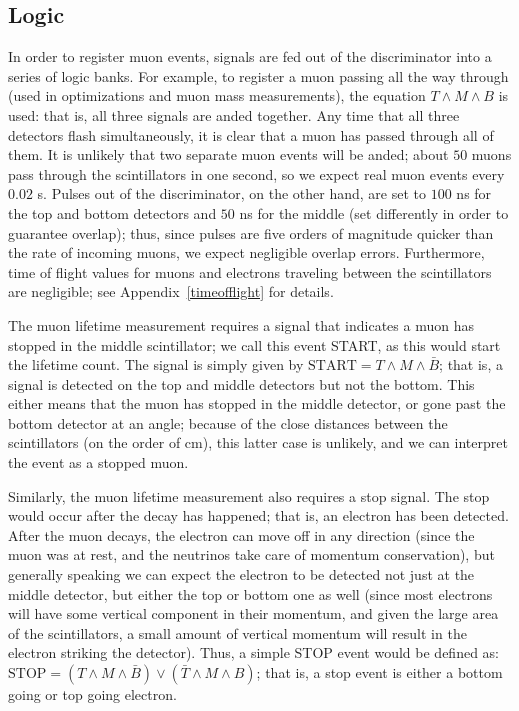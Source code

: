 \subsection{Logic}
\label{logic}

In order to register muon events, signals are fed out of the discriminator into a series of logic banks. For example, to register a muon passing all the way through (used in optimizations and muon mass measurements), the equation $T \wedge M \wedge B$ is used: that is, all three signals are anded together. Any time that all three detectors flash simultaneously, it is clear that a muon has passed through all of them. It is unlikely that two separate muon events will be anded; about $50$ muons pass through the scintillators in one second, so we expect real muon events every $0.02$ s. Pulses out of the discriminator, on the other hand, are set to $100$ ns for the top and bottom detectors and $50$ ns for the middle (set differently in order to guarantee overlap); thus, since pulses are five orders of magnitude quicker than the rate of incoming muons, we expect negligible overlap errors. Furthermore, time of flight values for muons and electrons traveling between the scintillators are negligible; see Appendix~\ref{timeofflight} for details.

The muon lifetime measurement requires a signal that indicates a muon has stopped in the middle scintillator; we call this event START, as this would start the lifetime count. The signal is simply given by $\mathrm{START} = T \wedge M \wedge \bar{B}$; that is, a signal is detected on the top and middle detectors but not the bottom. This either means that the muon has stopped in the middle detector, or gone past the bottom detector at an angle; because of the close distances between the scintillators (on the order of cm), this latter case is unlikely, and we can interpret the event as a stopped muon.

Similarly, the muon lifetime measurement also requires a stop signal. The stop would occur after the decay has happened; that is, an electron has been detected. After the muon decays, the electron can move off in any direction (since the muon was at rest, and the neutrinos take care of momentum conservation), but generally speaking we can expect the electron to be detected not just at the middle detector, but either the top or bottom one as well (since most electrons will have some vertical component in their momentum, and given the large area of the scintillators, a small amount of vertical momentum will result in the electron striking the detector). Thus, a simple STOP event would be defined as: $\mathrm{STOP} = (T \wedge M \wedge \bar{B}) \vee (\bar{T} \wedge M \wedge B)$; that is, a stop event is either a bottom going or top going electron.


